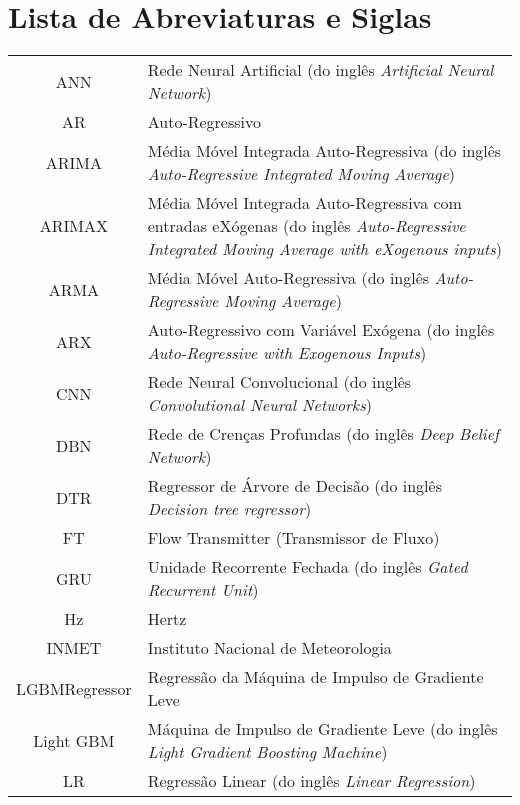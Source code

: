 \newpage
{}
\section*{Lista de Abreviaturas e Siglas}



\begin{tabular}{cp{}}
	ANN & Rede Neural Artificial (do inglês \textit{Artificial Neural Network}) \\
	AR & Auto-Regressivo\\
	ARIMA & Média Móvel Integrada Auto-Regressiva (do inglês \textit{Auto-Regressive Integrated Moving Average}) \\
	ARIMAX & Média Móvel Integrada Auto-Regressiva com entradas eXógenas (do inglês \textit{Auto-Regressive Integrated Moving Average with eXogenous inputs})\\
	ARMA & Média Móvel Auto-Regressiva (do inglês \textit{Auto-Regressive Moving Average}) \\
	ARX & Auto-Regressivo com Variável Exógena (do inglês \textit{Auto-Regressive with Exogenous Inputs})\\
	CNN & Rede Neural Convolucional (do inglês \textit{Convolutional Neural Networks})\\
	DBN & Rede de Crenças Profundas (do inglês \textit{Deep Belief Network}) \\
	DTR & Regressor de Árvore de Decisão (do inglês \textit{Decision tree regressor}) \\
	FT & Flow Transmitter (Transmissor de Fluxo)\\
	GRU & Unidade Recorrente Fechada (do inglês \textit{Gated Recurrent Unit}) \\
	Hz & Hertz\\
	INMET & Instituto Nacional de Meteorologia\\
	LGBMRegressor & Regressão da Máquina de Impulso de Gradiente Leve\\
	Light GBM & Máquina de Impulso de Gradiente Leve (do inglês \textit{Light Gradient Boosting Machine}) \\
	LR & Regressão Linear (do inglês \textit{Linear Regression})	
\end{tabular}

